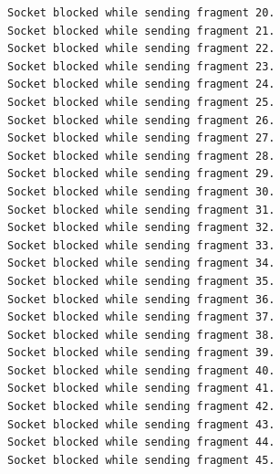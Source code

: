 \begin{lstlisting}[language=bash,basicstyle=\ttfamily\tiny]
Socket blocked while sending fragment 20.
Socket blocked while sending fragment 21.
Socket blocked while sending fragment 22.
Socket blocked while sending fragment 23.
Socket blocked while sending fragment 24.
Socket blocked while sending fragment 25.
Socket blocked while sending fragment 26.
Socket blocked while sending fragment 27.
Socket blocked while sending fragment 28.
Socket blocked while sending fragment 29.
Socket blocked while sending fragment 30.
Socket blocked while sending fragment 31.
Socket blocked while sending fragment 32.
Socket blocked while sending fragment 33.
Socket blocked while sending fragment 34.
Socket blocked while sending fragment 35.
Socket blocked while sending fragment 36.
Socket blocked while sending fragment 37.
Socket blocked while sending fragment 38.
Socket blocked while sending fragment 39.
Socket blocked while sending fragment 40.
Socket blocked while sending fragment 41.
Socket blocked while sending fragment 42.
Socket blocked while sending fragment 43.
Socket blocked while sending fragment 44.
Socket blocked while sending fragment 45.


\end{lstlisting}
